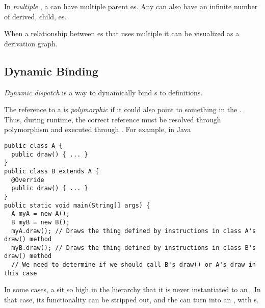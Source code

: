 \begin{definition}\label{def:OOP_Multiple_Inheritance}
  In \emph{multiple }, a  can have multiple parent es.
  Any  can also have an infinite number of derived, child, es.

  When a relationship between es that uses multiple  it can be visualized as a derivation graph.
\end{definition}

\subsection{Dynamic Binding}\label{subsec:OOP_Dynamic_Binding}
\begin{definition}\label{def:OOP_Dynamic_Dispatch}
  \emph{Dynamic dispatch} is a way to dynamically bind s to  definitions.
\end{definition}

\begin{definition}[Polymorphic]\label{def:OOP_Polymorphic}
  The reference to a  is \emph{polymorphic} if it could also point to something in the .
  Thus, during runtime, the correct reference must be resolved through polymorphism and executed through .
  For example, in Java
\begin{verbatim}
public class A {
  public draw() { ... }
}
public class B extends A {
  @Override
  public draw() { ... }
}
public static void main(String[] args) {
  A myA = new A();
  B myB = new B();
  myA.draw(); // Draws the thing defined by instructions in class A's draw() method
  myB.draw(); // Draws the thing defined by instructions in class B's draw() method
  // We need to determine if we should call B's draw() or A's draw in this case
\end{verbatim}
\end{definition}

In some cases, a  sit so high in the hierarchy that it is never instantiated to an .
In that case, its functionality can be stripped out, and the  can turn into an , with s.

